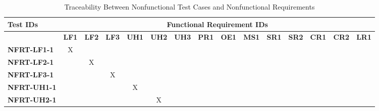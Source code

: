 \documentclass[12pt, titlepage]{article}
\begin{document}
\begin{landscape}
	\newpage

	\begin{longtable}{|l|cccccccccccccc|}
		\caption{Traceability Between Nonfunctional Test Cases and Nonfunctional Requirements}                                                                                                                                                                                             \\
		\hline
		\textbf{Test IDs}   & \multicolumn{14}{c|}{\textbf{Functional Requirement IDs}}                                                                                                                                                                                                    \\
		\hline
		~                   & \textbf{LF1}                                              & \textbf{LF2} & \textbf{LF3} & \textbf{UH1} & \textbf{UH2} & \textbf{UH3} & \textbf{PR1} & \textbf{OE1} & \textbf{MS1} & \textbf{SR1} & \textbf{SR2} & \textbf{CR1} & \textbf{CR2} & \textbf{LR1} \\
		\hline
		\textbf{NFRT-LF1-1} & X                                                         & ~            & ~            & ~            & ~            & ~            & ~            & ~            & ~            & ~            & ~            & ~            & ~            & ~            \\
		\textbf{NFRT-LF2-1} & ~                                                         & X            & ~            & ~            & ~            & ~            & ~            & ~            & ~            & ~            & ~            & ~            & ~            & ~            \\
		\textbf{NFRT-LF3-1} & ~                                                         & ~            & X            & ~            & ~            & ~            & ~            & ~            & ~            & ~            & ~            & ~            & ~            & ~            \\
		\textbf{NFRT-UH1-1} & ~                                                         & ~            & ~            & X            & ~            & ~            & ~            & ~            & ~            & ~            & ~            & ~            & ~            & ~            \\
		\textbf{NFRT-UH2-1} & ~                                                         & ~            & ~            & ~            & X            & ~            & ~            & ~            & ~            & ~            & ~            & ~            & ~            & ~            \\

\end{longtable}
\end{landscape}
\end{document}
